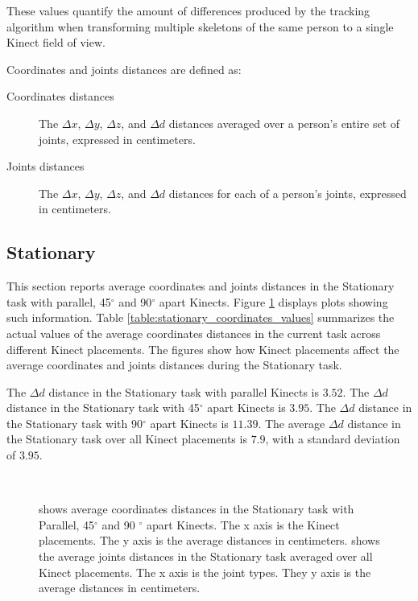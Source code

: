 These values quantify the amount of differences produced by the tracking algorithm when transforming multiple skeletons of the same person to a single Kinect field of view.

Coordinates and joints distances are defined as:

\begin{description}
  \item[Coordinates distances] The $\Delta x$, $\Delta y$, $\Delta z$, and $\Delta d$ distances averaged over a person's entire set of joints, expressed in centimeters.
  \item[Joints distances] The $\Delta x$, $\Delta y$, $\Delta z$, and $\Delta d$ distances for each of a person's joints, expressed in centimeters. 
\end{description}

% 
% 
\subsection{Stationary}

This section reports average coordinates and joints distances in the Stationary task with parallel, 45$^{\circ}$ and 90$^{\circ}$ apart Kinects. Figure \ref{fig:stationary_coordinates_joints} displays plots showing such information. Table \ref{table:stationary_coordinates_values} summarizes the actual values of the average coordinates distances in the current task across different Kinect placements. The figures show how Kinect placements affect the average coordinates and joints distances during the Stationary task.

The $\Delta d$ distance in the Stationary task with parallel Kinects is $3.52$. The $\Delta d$ distance in the Stationary task with 45$^{\circ}$ apart Kinects is $3.95$. The $\Delta d$ distance in the Stationary task with 90$^{\circ}$ apart Kinects is $11.39$. The average $\Delta d$ distance in the Stationary task over all Kinect placements is $7.9$, with a standard deviation of $3.95$.

% 
% 
\begin{figure}[!htb]
  \centering

  \subfloat[]{
    
    \label{fig:stationary_coordinates}
  } \\
  \subfloat[]{
    
    \label{fig:stationary_joints}
  }

  \caption{\protect{} shows average coordinates distances in the Stationary task with Parallel, 45$^{\circ}$ and 90 $^{\circ}$ apart Kinects. The x axis is the Kinect placements. The y axis is the average distances in centimeters. \protect{} shows the average joints distances in the Stationary task averaged over all Kinect placements. The x axis is the joint types. They y axis is the average distances in centimeters.}

  \label{fig:stationary_coordinates_joints}
\end{figure}

